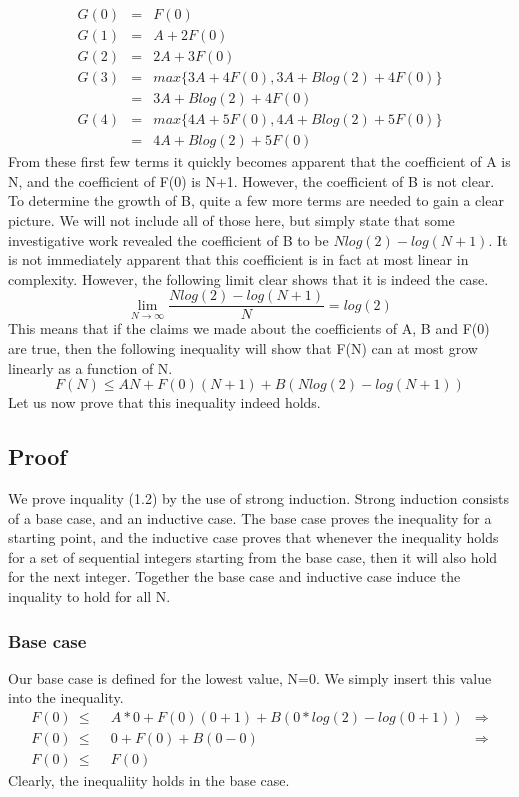 \begin{eqnarray*}
	G(0) &=& F(0) \\
	G(1) &=& A + 2F(0) \\
	G(2) &=& 2A + 3F(0) \\
	G(3) &=& max\{3A + 4F(0), 3A + Blog(2) + 4F(0)\} \\
	     &=& 3A + Blog(2) + 4F(0) \\
	G(4) &=& max\{4A + 5F(0), 4A + Blog(2) + 5F(0)\} \\
	     &=& 4A + Blog(2) + 5F(0)
\end{eqnarray*}
From these first few terms it quickly becomes apparent that the coefficient of A is N, and the coefficient of F(0) is N+1. However, the coefficient of B is not clear. To determine the growth of B, quite a few more terms are needed to gain a clear picture. We will not include all of those here, but simply state that some investigative work revealed the coefficient of B to be $Nlog(2)-log(N+1)$. It is not immediately apparent that this coefficient is in fact at most linear in complexity. However, the following limit clear shows that it is indeed the case.
$$\lim_{N\to\infty} \frac{Nlog(2)-log(N+1)}{N} = log(2)$$
This means that if the claims we made about the coefficients of A, B and F(0) are true, then the following inequality will show that F(N) can at most grow linearly as a function of N.
\begin{equation}
	F(N) \le AN + F(0)(N+1) + B(Nlog(2)-log(N+1)) 	
\end{equation}
Let us now prove that this inequality indeed holds.
\subsection{Proof}
We prove inquality (1.2) by the use of strong induction. Strong induction consists of a base case, and an inductive case. The base case proves the inequality for a starting point, and the inductive case proves that whenever the inequality holds for a set of sequential integers starting from the base case, then it will also hold for the next integer. Together the base case and inductive case induce the inquality to hold for all N. 
\subsubsection{Base case}
Our base case is defined for the lowest value, N=0. We simply insert this value into the inequality.
\begin{align*}
	F(0)\ \le&\ \  A*0 + F(0)(0+1) + B(0*log(2)-log(0+1)) & \Rightarrow \\
	F(0)\ \le&\ \  0 + F(0) + B(0-0) & \Rightarrow \\
	F(0)\ \le&\ \  F(0) &
\end{align*}
Clearly, the inequaliity holds in the base case.

